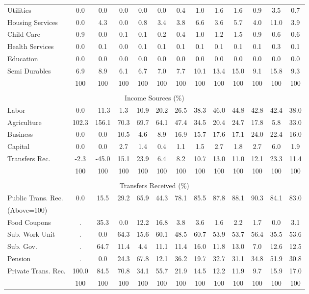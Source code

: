 \begin{tabular}{l c c c| c c c c c| c c c| c}
Utilities    & 0.0 & 0.0 & 0.0 & 0.0 & 0.0 & 0.4 & 1.0 & 1.6 & 1.6 & 0.9 & 3.5 & 0.7 \\
Housing Services  & 0.0 & 4.3 & 0.0 & 0.8 & 3.4 & 3.8 & 6.6 & 3.6 & 5.7 & 4.0 & 11.0 & 3.9 \\
Child Care   & 0.9 & 0.0 & 0.1 & 0.1 & 0.2 & 0.4 & 1.0 & 1.2 & 1.5 & 0.9 & 0.6 & 0.6 \\
Health Services    & 0.0 & 0.1 & 0.0 & 0.1 & 0.1 & 0.1 & 0.1 & 0.1 & 0.1 & 0.1 & 0.3 & 0.1 \\
Education   & 0.0 & 0.0 & 0.0 & 0.0 & 0.0 & 0.0 & 0.0 & 0.0 & 0.0 & 0.0 & 0.0 & 0.0 \\
Semi Durables     & 6.9 & 8.9 & 6.1 & 6.7 & 7.0 & 7.7 & 10.1 & 13.4 & 15.0 & 9.1 & 15.8 & 9.3 \\
\midrule
 & 100 & 100 & 100 & 100 & 100 & 100 & 100 & 100 & 100 & 100 & 100 & 100 \\
\midrule \\
\multicolumn{13}{c}{Income Sources (\%)}  \\
\midrule
Labor        & 0.0 & -11.3 & 1.3 & 10.9 & 20.2 & 26.5 & 38.3 & 46.0 & 44.8 & 42.8 & 42.4 & 38.0 \\
Agriculture  & 102.3 & 156.1 & 70.3 & 69.7 & 64.1 & 47.4 & 34.5 & 20.4 & 24.7 & 17.8 & 5.8 & 33.0 \\
Business     & 0.0 & 0.0 & 10.5 & 4.6 & 8.9 & 16.9 & 15.7 & 17.6 & 17.1 & 24.0 & 22.4 & 16.0 \\
Capital      & 0.0 & 0.0 & 2.7 & 1.4 & 0.4 & 1.1 & 1.5 & 2.7 & 1.8 & 2.7 & 6.0 & 1.9 \\
Transfers Rec.  & -2.3 & -45.0 & 15.1 & 23.9 & 6.4 & 8.2 & 10.7 & 13.0 & 11.0 & 12.1 & 23.3 & 11.4 \\
\midrule
 & 100 & 100 & 100 & 100 & 100 & 100 & 100 & 100 & 100 & 100 & 100 & 100 \\
\midrule \\
\multicolumn{13}{c}{Transfers Received (\%)}  \\
\midrule
Public Trans. Rec.  & 0.0 & 15.5 & 29.2 & 65.9 & 44.3 & 78.1 & 85.5 & 87.8 & 88.1 & 90.3 & 84.1 & 83.0 \\
(Above=100) & & & & & & & & & & & &  \\
\hspace{.3cm} Food Coupons    & . & 35.3 & 0.0 & 12.2 & 16.8 & 3.8 & 3.6 & 1.6 & 2.2 & 1.7 & 0.0 & 3.1 \\
\hspace{.3cm} Sub. Work Unit  & . & 0.0 & 64.3 & 15.6 & 60.1 & 48.5 & 60.7 & 53.9 & 53.7 & 56.4 & 35.5 & 53.6 \\
\hspace{.3cm} Sub. Gov.       & . & 64.7 & 11.4 & 4.4 & 11.1 & 11.4 & 16.0 & 11.8 & 13.0 & 7.0 & 12.6 & 12.5 \\
\hspace{.3cm} Pension         & . & 0.0 & 24.3 & 67.8 & 12.1 & 36.2 & 19.7 & 32.7 & 31.1 & 34.8 & 51.9 & 30.8 \\
Private Trans. Rec. & 100.0 & 84.5 & 70.8 & 34.1 & 55.7 & 21.9 & 14.5 & 12.2 & 11.9 & 9.7 & 15.9 & 17.0 \\
\midrule
 & 100 & 100 & 100 & 100 & 100 & 100 & 100 & 100 & 100 & 100 & 100 & 100 \\
\bottomrule
\end{tabular}